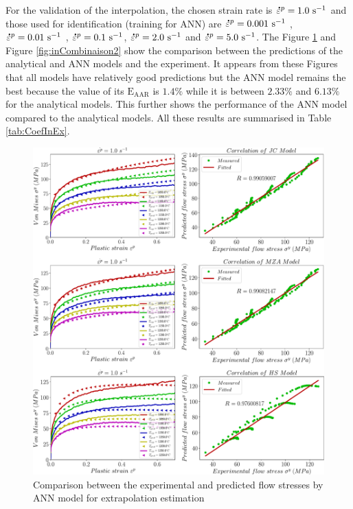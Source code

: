 \documentclass[twoside,english,1p,final,sort&compress]{elsarticle}
\theoremstyle{plain}
\newcommand{\mdot}[1]{\accentset{\mbox{\bfseries .}}{#1}}
\newcommand{\AARE}{\text{E}_\text{AAR}}
\begin{document}
For the validation of the interpolation, the chosen strain rate is $\mdot{\varepsilon}^p = 1.0\ \text{s}^{-1}$ and those used for identification (training for ANN) are $\mdot{\varepsilon}^p = 0.001\ \text{s}^{-1}$ , $\mdot{\varepsilon}^p = 0.01\ \text{s}^{-1}$ , $\mdot{\varepsilon}^p = 0.1\ \text{s}^{-1}$, $\mdot{\varepsilon}^p = 2.0\ \text{s}^{-1}$  and $\mdot{\varepsilon}^p = 5.0\ \text{s}^{-1}$. The Figure \ref{fig:inCombinaison1} and Figure \ref{fig:inCombinaison2} show the comparison between the predictions of the analytical and ANN models and the experiment. It appears from these Figures that all models have relatively good predictions but the ANN model remains the best because the value of its $\AARE$ is $1.4\%$ while it is between $2.33\%$ and $6.13\%$ for the analytical models. This further shows the performance of the ANN model compared to the analytical models. All these results are summarised in Table \ref{tab:CoefInEx}.
\begin{figure}[!ht]
\centering
\includegraphics[width=1.02\columnwidth]
{newFigures/inCombinaison1}
\caption{Comparison between the experimental and predicted flow stresses by ANN model for extrapolation estimation}
\label{fig:inCombinaison1}
\end{figure}
\end{document}
